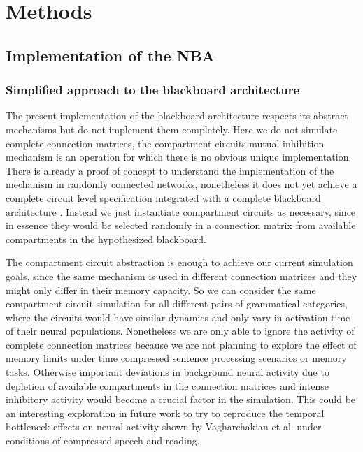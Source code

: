 \documentclass[10pt]{article}
\begin{document}
\section{Methods}

{\label{488128}}

\subsection{Implementation of the NBA}\label{implementation-of-the-nba}

\subsubsection{Simplified approach to the blackboard
architecture}\label{simplified-approach-to-the-blackboard-architecture}

The present implementation of the blackboard architecture respects its
abstract mechanisms but do not implement them completely. Here we do not
simulate complete connection matrices, the compartment circuits mutual
inhibition mechanism is an operation for which there is no obvious
unique implementation. There is already a proof of concept to understand
the implementation of the mechanism in randomly connected networks,
nonetheless it does not yet achieve a complete circuit level
specification integrated with a complete blackboard architecture
\cite{van_der_Velde_2011}. Instead we just instantiate compartment circuits as
necessary, since in essence they would be selected randomly in a
connection matrix from available compartments in the hypothesized
blackboard.

The compartment circuit abstraction is enough to achieve our current
simulation goals, since the same mechanism is used in different
connection matrices and they might only differ in their memory capacity.
So we can consider the same compartment circuit simulation for all
different pairs of grammatical categories, where the circuits would have
similar dynamics and only vary in activation time of their neural
populations. Nonetheless we are only able to ignore the activity of
complete connection matrices because we are not planning to explore the
effect of memory limits under time compressed sentence processing
scenarios or memory tasks. Otherwise important deviations in background
neural activity due to depletion of available compartments in the
connection matrices and intense inhibitory activity would become a
crucial factor in the simulation. This could be an interesting
exploration in future work to try to reproduce the temporal bottleneck
effects on neural activity shown by Vagharchakian et al. under
conditions of compressed speech and reading\cite{Vagharchakian_2012}.
\end{document}
